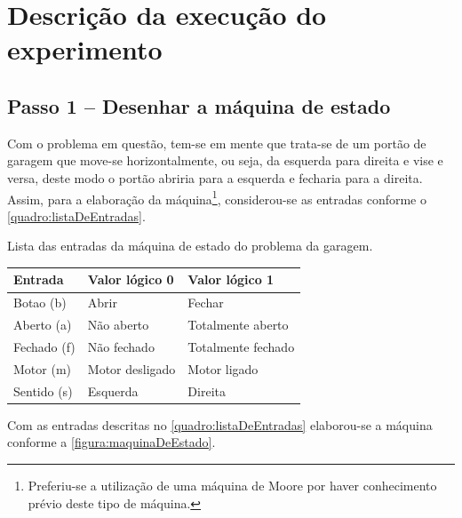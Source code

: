 \chapter{Descrição da execução do experimento}
	\section{Passo 1 – Desenhar a máquina de estado}
		Com o problema em questão, tem-se em mente que trata-se de um portão de garagem
		que move-se horizontalmente, ou seja, da esquerda para direita e vise e versa, deste
		modo o portão abriria para a esquerda e fecharia para a direita.
		Assim, para a elaboração da máquina\footnote{Preferiu-se a utilização de uma máquina de Moore
		por haver conhecimento prévio deste tipo de máquina.}, considerou-se as entradas conforme o
		\autoref{quadro:listaDeEntradas}.

		\begin{quadro}[H]
			\centering
			\caption{Lista das entradas da máquina de estado do problema da garagem.}
			\label{quadro:listaDeEntradas}
			\begin{tabular}{|l|l|l|}
			  \hline
			   \textbf{Entrada} & \textbf{Valor lógico 0}  & \textbf{Valor lógico 1}\\
			    \hline
				   Botao (b) & Abrir & Fechar \\
			   	\hline
			   		Aberto (a) & Não aberto & Totalmente aberto \\
			    \hline
					Fechado (f) & Não fechado & Totalmente fechado \\
			    \hline
			    	Motor (m) & Motor desligado & Motor ligado \\
			    \hline
					Sentido (s) & Esquerda & Direita \\
			   \hline
			\end{tabular}
		\end{quadro}

		Com as entradas descritas no \autoref{quadro:listaDeEntradas} elaborou-se a máquina conforme a
		\autoref{figura:maquinaDeEstado}.

